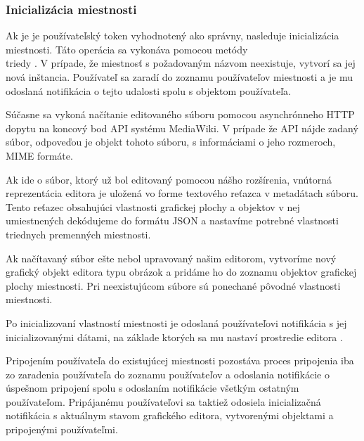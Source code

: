 \subsubsection{Inicializácia miestnosti}
Ak je je používateľský token vyhodnotený ako správny, nasleduje inicializácia miestnosti. Táto operácia sa vykonáva pomocou metódy \\ triedy . V prípade, že miestnosť s požadovaným názvom neexistuje, vytvorí sa jej nová inštancia. Používateľ sa zaradí do zoznamu používateľov miestnosti a je mu odoslaná notifikácia o tejto udalosti spolu s objektom používateľa.

Súčasne sa vykoná načítanie editovaného súboru pomocou asynchrónneho HTTP dopytu na koncový bod API systému MediaWiki. V prípade že API nájde zadaný súbor, odpoveďou je objekt tohoto súboru, s informáciami o jeho rozmeroch, MIME formáte. 

Ak ide o súbor, ktorý už bol editovaný pomocou nášho rozšírenia, vnútorná reprezentácia editora je uložená vo forme textového reťazca v metadátach súboru. Tento reťazec obsahujúci vlastnosti grafickej plochy a objektov v nej umiestnených dekódujeme do formátu JSON a nastavíme potrebné vlastnosti triednych premenných miestnosti. 

Ak načítavaný súbor ešte nebol upravovaný našim editorom, vytvoríme nový grafický objekt editora typu obrázok a pridáme ho do zoznamu objektov grafickej plochy miestnosti. Pri neexistujúcom súbore sú ponechané pôvodné vlastnosti miestnosti.

Po inicializovaní vlastností miestnosti je odoslaná používateľovi notifikácia s jej inicializovanými dátami, na základe ktorých sa mu nastaví prostredie editora .

Pripojením používateľa do existujúcej miestnosti pozostáva proces pripojenia iba zo zaradenia používateľa do zoznamu používateľov a odoslania notifikácie o úspešnom pripojení spolu s odoslaním notifikácie všetkým ostatným používateľom. Pripájanému používateľovi sa taktiež odosiela inicializačná notifikácia s aktuálnym stavom grafického editora, vytvorenými objektami a pripojenými používateľmi.

